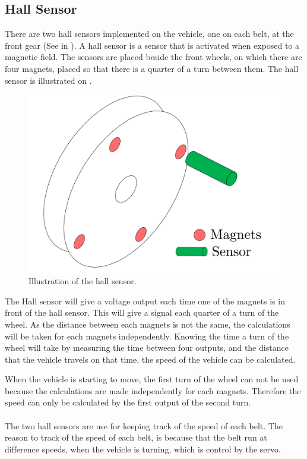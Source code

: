 \subsection{Hall Sensor}
There are two hall sensors implemented on the vehicle, one on each belt, at the front gear (See  in \secref{}). A hall sensor is a sensor that is activated when exposed to a magnetic field. The sensors are placed beside the front wheels, on which there are four magnets, placed so that there is a quarter of a turn between them. The hall sensor is illustrated on .

 \begin{figure}[H]
	\centering
	\includegraphics[scale=0.5]{figures/HallSensorSide_Forward_view.pdf}
	\caption{Illustration of the hall sensor.}
	\label{HallSensor}
\end{figure}

The Hall sensor will give a voltage output each time one of the magnets is in front of the hall sensor. This will give a signal each quarter of a turn of the wheel. As the distance between each magnets is not the same, the calculations will be taken for each magnets independently.
Knowing the time a turn of the wheel will take by measuring the time between four outputs, and the distance that the vehicle travels on that time, the speed of the vehicle can be calculated.

When the vehicle is starting to move, the first turn of the wheel can not be used because the calculations are made independently for each magnets. Therefore the speed can only be calculated by the first output of the second turn.\\\\

The two hall sensors are use for keeping track of the speed of each belt. The reason to track of the speed of each belt, is because that the belt run at difference speeds, when the vehicle is turning, which is control by the servo.
